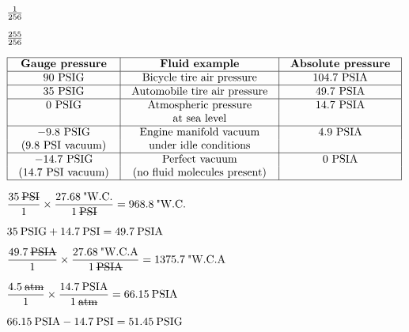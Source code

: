 \documentclass[12pt,a4paper,margin=2cm]{book}
\def\lthtmlcheckvsize{\ifdim\ht\sizebox<\vsize 
  \ifdim\wd\sizebox<\hsize\expandafter\hfill\fi \expandafter\vfill
  \else\expandafter\vss\fi}%
\begin{document}
{\newpage\clearpage
{}%
$ 1 \over 256$%
\lthtmlindisplaymathZ
\lthtmlcheckvsize\clearpage}

{\newpage\clearpage
{}%
$ 255 \over 256$%
\lthtmlindisplaymathZ
\lthtmlcheckvsize\clearpage}

{\newpage\clearpage
{}%
$\displaystyle \vbox{\offinterlineskip
\halign{\strut
\vrule \quad\hfil # \  \hfil & 
\vrule \quad\hfil # \  \hfil & 
\vrule \quad\hfil # \  \hfil \vrule \cr
\noalign{\hrule }
\textbf{Gauge pressure} & \textbf{Fluid example} & \textbf{Absolute pressure} \cr
\noalign{\hrule }
90 PSIG & Bicycle tire air pressure & 104.7 PSIA \cr
\noalign{\hrule }
35 PSIG & Automobile tire air pressure & 49.7 PSIA \cr
\noalign{\hrule }
0 PSIG & Atmospheric pressure & 14.7 PSIA \cr
 & at sea level & \cr
\noalign{\hrule }
$-9.8$ PSIG & Engine manifold vacuum & 4.9 PSIA \cr
(9.8 PSI vacuum) & under idle conditions & \cr
\noalign{\hrule }
$-14.7$ PSIG & Perfect vacuum & 0 PSIA \cr
(14.7 PSI vacuum) & (no fluid molecules present) & \cr
\noalign{\hrule }
} %
}$%
\lthtmlindisplaymathZ
\lthtmlcheckvsize\clearpage}

{\newpage\clearpage
{}%
$\displaystyle {{35 \> \hbox{\sout{PSI}}} \over 1} \times {{27.68 \> \hbox{"W.C.}} \over {1 \> \hbox{\sout{PSI}}}} = 968.8 \> \hbox{"W.C.}$%
\lthtmlindisplaymathZ
\lthtmlcheckvsize\clearpage}

{\newpage\clearpage
{}%
$\displaystyle 35 \> \hbox{PSIG} + 14.7 \> \hbox{PSI} = 49.7 \> \hbox{PSIA}$%
\lthtmlindisplaymathZ
\lthtmlcheckvsize\clearpage}

{\newpage\clearpage
{}%
$\displaystyle {{49.7 \> \hbox{\sout{PSIA}}} \over 1} \times {{27.68 \> \hbox{"W.C.A}} \over {1 \> \hbox{\sout{PSIA}}}} = 1375.7 \> \hbox{"W.C.A}$%
\lthtmlindisplaymathZ
\lthtmlcheckvsize\clearpage}

{\newpage\clearpage
{}%
$\displaystyle {{4.5 \> \hbox{\sout{atm}}} \over 1} \times {{14.7 \> \hbox{PSIA}} \over {1 \> \hbox{\sout{atm}}}} = 66.15 \> \hbox{PSIA}$%
\lthtmlindisplaymathZ
\lthtmlcheckvsize\clearpage}

{\newpage\clearpage
{}%
$\displaystyle 66.15 \> \hbox{PSIA} - 14.7 \> \hbox{PSI} = 51.45 \> \hbox{PSIG}$%
\lthtmlindisplaymathZ
\lthtmlcheckvsize\clearpage}
\end{document}

